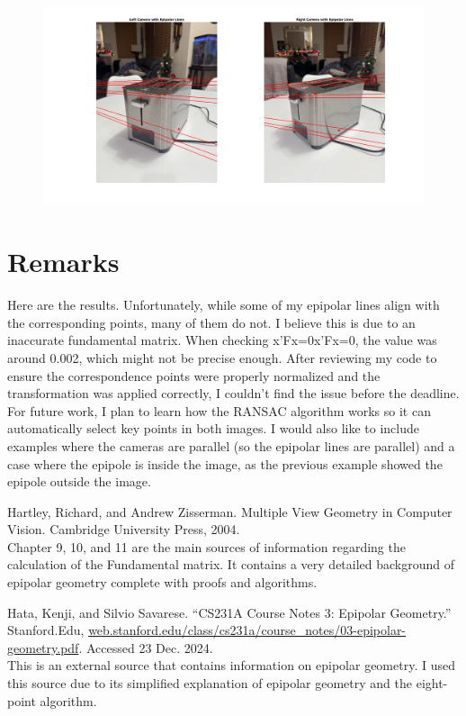 \documentclass{article}
\begin{document}
\begin{figure}[H]
    \centering
    \includegraphics[width=1\textwidth]{results.png}
\end{figure}

\section{Remarks}
Here are the results. Unfortunately, while some of my epipolar lines align with the corresponding points, many of them do not. I believe this is due to an inaccurate fundamental matrix. When checking x'Fx=0x'Fx=0, the value was around 0.002, which might not be precise enough. After reviewing my code to ensure the correspondence points were properly normalized and the transformation was applied correctly, I couldn't find the issue before the deadline.\\

For future work, I plan to learn how the RANSAC algorithm works so it can automatically select key points in both images. I would also like to include examples where the cameras are parallel (so the epipolar lines are parallel) and a case where the epipole is inside the image, as the previous example showed the epipole outside the image.


\begin{thebibliography}{2}
    Hartley, Richard, and Andrew Zisserman. Multiple View Geometry in Computer Vision. Cambridge University Press, 2004. \\
    Chapter 9, 10, and 11 are the main sources of information regarding the calculation of the Fundamental matrix. It contains a very detailed background of epipolar geometry complete with proofs and algorithms. 

    Hata, Kenji, and Silvio Savarese. “CS231A Course Notes 3: Epipolar Geometry.” Stanford.Edu, \url{web.stanford.edu/class/cs231a/course_notes/03-epipolar-geometry.pdf}. Accessed 23 Dec. 2024. \\ 
    This is an external source that contains information on epipolar geometry. I used this source due to its simplified explanation of epipolar geometry and the eight-point algorithm.

\end{thebibliography}
\end{document}
